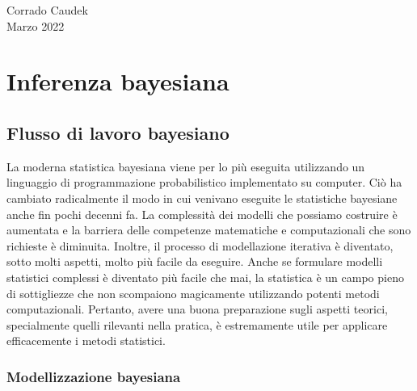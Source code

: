 \documentclass[
  11pt,
]{krantz}
\theoremstyle{definition}
\theoremstyle{definition}
\theoremstyle{definition}
\theoremstyle{definition}
\theoremstyle{remark}
\begin{document}
\begin{flushright}
Corrado Caudek\\
Marzo 2022 \end{flushright}

\mainmatter

\hypertarget{part-inferenza-bayesiana}{%
\part{Inferenza bayesiana}\label{part-inferenza-bayesiana}}

\hypertarget{ch:intro-bayes-inference}{%
\chapter{Flusso di lavoro bayesiano}\label{ch:intro-bayes-inference}}

La moderna statistica bayesiana viene per lo più eseguita utilizzando un linguaggio di programmazione probabilistico implementato su computer. Ciò ha cambiato radicalmente il modo in cui venivano eseguite le statistiche bayesiane anche fin pochi decenni fa. La complessità dei modelli che possiamo costruire è aumentata e la barriera delle competenze matematiche e computazionali che sono richieste è diminuita. Inoltre, il processo di modellazione iterativa è diventato, sotto molti aspetti, molto più facile da eseguire. Anche se formulare modelli statistici complessi è diventato più facile che mai, la statistica è un campo pieno di sottigliezze che non scompaiono magicamente utilizzando potenti metodi computazionali. Pertanto, avere una buona preparazione sugli aspetti teorici, specialmente quelli rilevanti nella pratica, è estremamente utile per applicare efficacemente i metodi statistici.

\hypertarget{modellizzazione-bayesiana}{%
\section{Modellizzazione bayesiana}\label{modellizzazione-bayesiana}}
\end{document}
